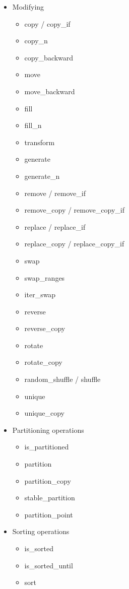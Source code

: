 \begin{itemize}
\begin{itemize}
		\end{itemize}
	\item Modifying
		\begin{itemize}
			\item copy / copy\_if
			\item copy\_n
			\item copy\_backward
			\item move
			\item move\_backward
			\item fill
			\item fill\_n
			\item transform
			\item generate
			\item generate\_n
			\item remove / remove\_if
			\item remove\_copy / remove\_copy\_if
			\item replace / replace\_if
			\item replace\_copy / replace\_copy\_if
			\item swap
			\item swap\_ranges
			\item iter\_swap
			\item reverse
			\item reverse\_copy
			\item rotate
			\item rotate\_copy
			\item random\_shuffle / shuffle
			\item unique
			\item unique\_copy
		\end{itemize}
	\item Partitioning operations
		\begin{itemize}
			\item is\_partitioned
			\item partition
			\item partition\_copy
			\item stable\_partition
			\item partition\_point
		\end{itemize}
	\item Sorting operations
		\begin{itemize}
			\item is\_sorted
			\item is\_sorted\_until
			\item sort

\end{itemize}
\end{itemize}
